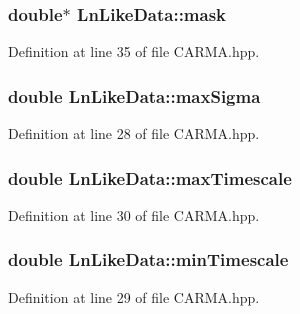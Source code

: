 \hypertarget{struct_ln_like_data_a51c6e3bd71666d529910318735f0df21}{
\subsubsection[{mask}]{\setlength{\rightskip}{0pt plus 5cm}double$\ast$ Ln\-Like\-Data\-::mask}}\label{struct_ln_like_data_a51c6e3bd71666d529910318735f0df21}


Definition at line 35 of file C\-A\-R\-M\-A.\-hpp.

\hypertarget{struct_ln_like_data_ae30e91660af267721f78434f5e771293}{
\subsubsection[{max\-Sigma}]{\setlength{\rightskip}{0pt plus 5cm}double Ln\-Like\-Data\-::max\-Sigma}}\label{struct_ln_like_data_ae30e91660af267721f78434f5e771293}


Definition at line 28 of file C\-A\-R\-M\-A.\-hpp.

\hypertarget{struct_ln_like_data_ab1c1eb4d8e84c78b1b76849adfd0aeb8}{
\subsubsection[{max\-Timescale}]{\setlength{\rightskip}{0pt plus 5cm}double Ln\-Like\-Data\-::max\-Timescale}}\label{struct_ln_like_data_ab1c1eb4d8e84c78b1b76849adfd0aeb8}


Definition at line 30 of file C\-A\-R\-M\-A.\-hpp.

\hypertarget{struct_ln_like_data_a429a07a037a45e99a52c0c9e6193b23d}{
\subsubsection[{min\-Timescale}]{\setlength{\rightskip}{0pt plus 5cm}double Ln\-Like\-Data\-::min\-Timescale}}\label{struct_ln_like_data_a429a07a037a45e99a52c0c9e6193b23d}


Definition at line 29 of file C\-A\-R\-M\-A.\-hpp.

